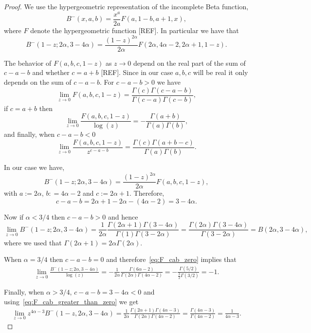 \begin{appendices}
\begin{proof}
We use the hypergeometric representation of the incomplete Beta function,
\[
	B^-(x, a, b) = \frac{x^a}{2a}F(a, 1-b,a+1,x),
\]
where $F$ denote the hypergeometric function [REF]. In particular we have that
\[
	B^-(1-z; 2\alpha, 3-4\alpha ) = \frac{(1-z)^{2\alpha}}{2\alpha} F(2\alpha,4\alpha-2,2\alpha+1,1-z).
\]

The behavior of $F(a,b,c,1-z)$ as $z \to 0$ depend on the real part of the sum of $c - a - b$ and whether $c = a + b$ [REF]. Since in our case $a,b,c$ will be real it only depends on the sum of $c - a - b$. For $c - a - b > 0$ we have
\begin{equation}\label{eq:F_cab_less_than_zero}
	\lim_{z \to 0} F(a,b,c,1-z) = \frac{\Gamma(c)\Gamma(c-a-b)}{\Gamma(c-a)\Gamma(c-b)},
\end{equation}
if $c = a + b$ then
\begin{equation}\label{eq:F_cab_zero}
	\lim_{z \to 0} \frac{F(a,b,c,1-z)}{\log(z)} = -\frac{\Gamma(a+b)}{\Gamma(a)\Gamma(b)},
\end{equation}
and finally, when $c - a - b < 0$
\begin{equation}\label{eq:F_cab_greater_than_zero}
	\lim_{z \to 0} \frac{F(a,b,c,1-z)}{z^{c - a - b}} = \frac{\Gamma(c)\Gamma(a + b -c)}{\Gamma(a)\Gamma(b)}.
\end{equation}

In our case we have,
\[
	B^-(1-z; 2\alpha, 3-4\alpha ) = \frac{(1-z)^{2\alpha}}{2\alpha} F(a,b,c,1-z),
\]
with $a := 2\alpha$, $b: = 4\alpha-2$ and $c := 2\alpha + 1$. Therefore,
\[
	c - a - b = 2\alpha + 1 - 2\alpha -(4\alpha - 2) = 3 - 4\alpha.
\]

Now if $\alpha < 3/4$ then $c - a - b > 0$ and hence
\[
	\lim_{z \to 0} B^-(1-z; 2\alpha, 3-4\alpha ) = \frac{1}{2\alpha} \frac{\Gamma(2\alpha + 1)\Gamma(3 - 4\alpha)}{\Gamma(1)\Gamma(3-2\alpha)} = \frac{\Gamma(2\alpha)\Gamma(3 - 4\alpha)}{\Gamma(3-2\alpha)}
	= B(2\alpha, 3 - 4\alpha),
\]
where we used that $\Gamma(2\alpha + 1) = 2\alpha \Gamma(2\alpha)$.

When $\alpha =3/4$ then $c - a - b = 0$ and therefore~\eqref{eq:F_cab_zero} implies that
\begin{align*}
	\lim_{z \to 0} \frac{B^-(1-z; 2\alpha, 3-4\alpha )}{\log(z)} 
	= -\frac{1}{2\alpha} \frac{\Gamma(6\alpha - 2)}{\Gamma(2\alpha)\Gamma(4\alpha - 2)}
	= - \frac{\Gamma(5/2)}{\frac{3}{2}\Gamma(3/2)} = -1.
\end{align*}

Finally, when $\alpha > 3/4$, $c - a - b = 3 - 4\alpha < 0$ and using~\eqref{eq:F_cab_greater_than_zero} we get
\begin{align*}
	\lim_{z \to 0} z^{4\alpha - 3} B^-(1-z, 2\alpha, 3-4\alpha ) 
	= \frac{1}{2\alpha}\frac{\Gamma(2\alpha + 1)\Gamma(4\alpha - 3)}{\Gamma(2\alpha)\Gamma(4\alpha - 2)}
	= \frac{\Gamma(4\alpha - 3)}{\Gamma(4\alpha - 2)} = \frac{1}{4\alpha - 3}.
\end{align*}
\end{proof}


\end{appendices}
